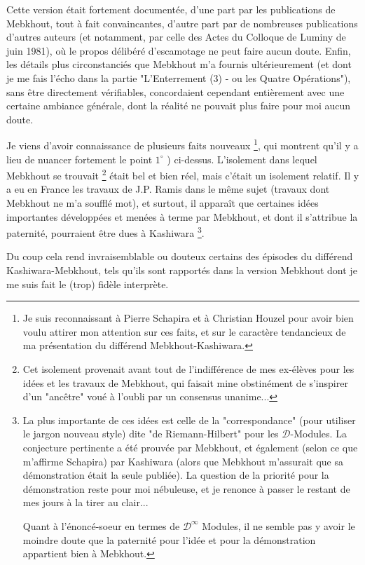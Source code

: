Cette version était fortement documentée, d'une part par les publications de Mebkhout, tout à fait convaincantes, d'autre part par de nombreuses publications d'autres auteurs (et notamment, par celle des Actes du Colloque de Luminy de juin 1981), où le propos délibéré d'escamotage ne peut faire aucun doute. Enfin, les détails plus circonstanciés que Mebkhout m'a fournis ultérieurement (et dont je me fais l'écho dans la partie "L'Enterrement (3) - ou les Quatre Opérations"), sans être directement vérifiables, concordaient cependant entièrement avec une certaine ambiance générale, dont la réalité ne pouvait plus faire pour moi aucun doute.

Je viens d'avoir connaissance de plusieurs faits nouveaux \footnote{Je suis reconnaissant à Pierre Schapira et à Christian Houzel pour avoir bien voulu attirer mon attention sur ces faits, et sur le caractère tendancieux de ma présentation du différend Mebkhout-Kashiwara.}, qui montrent qu'il y a lieu de nuancer fortement le point $1^{\circ}$ ) ci-dessus. L'isolement dans lequel Mebkhout se trouvait \footnote{Cet isolement provenait avant tout de l'indifférence de mes ex-élèves pour les idées et les travaux de Mebkhout, qui faisait mine obstinément de s'inspirer d'un "ancêtre" voué à l'oubli par un consensus unanime...} était bel et bien réel, mais c'était un isolement relatif. Il y a eu en France les travaux de J.P. Ramis dans le même sujet (travaux dont Mebkhout ne m'a soufflé mot), et surtout, il apparaît que certaines idées importantes développées et menées à terme par Mebkhout, et dont il s'attribue la paternité, pourraient être dues à Kashiwara \footnote{La plus importante de ces idées est celle de la "correspondance" (pour utiliser le jargon nouveau style) dite "de Riemann-Hilbert" pour les $\mathscr{D}$-Modules. La conjecture pertinente a été prouvée par Mebkhout, et également (selon ce que m'affirme Schapira) par Kashiwara (alors que Mebkhout m'assurait que sa démonstration était la seule publiée). La question de la priorité pour la démonstration reste pour moi nébuleuse, et je renonce à passer le restant de mes jours à la tirer au clair...

Quant à l’énoncé-soeur en termes de $\mathscr{D}^{\infty}$ Modules, il ne semble pas y avoir le moindre doute que la paternité pour l'idée et pour la démonstration appartient bien à Mebkhout.}.

Du coup cela rend invraisemblable ou douteux certains des épisodes du différend Kashiwara-Mebkhout, tels qu'ils sont rapportés dans la version Mebkhout dont je me suis fait le (trop) fidèle interprète.

